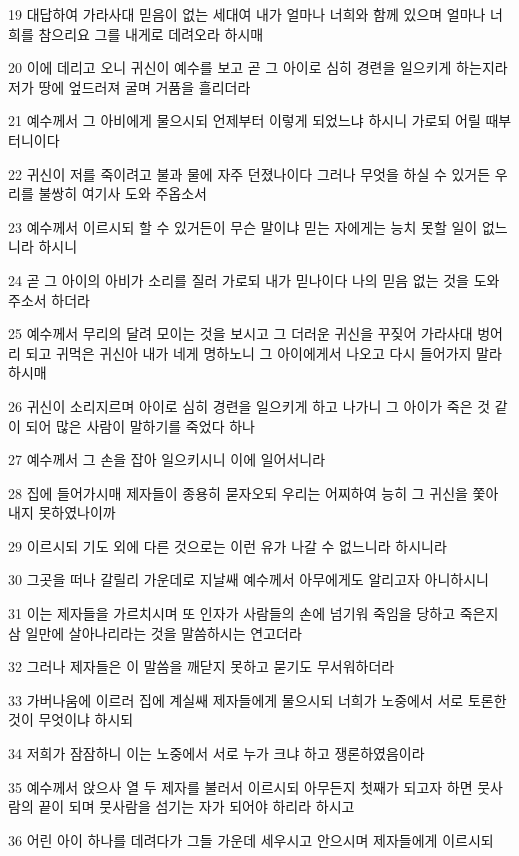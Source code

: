 \par 19 대답하여 가라사대 믿음이 없는 세대여 내가 얼마나 너희와 함께 있으며 얼마나 너희를 참으리요 그를 내게로 데려오라 하시매
\par 20 이에 데리고 오니 귀신이 예수를 보고 곧 그 아이로 심히 경련을 일으키게 하는지라 저가 땅에 엎드러져 굴며 거품을 흘리더라
\par 21 예수께서 그 아비에게 물으시되 언제부터 이렇게 되었느냐 하시니 가로되 어릴 때부터니이다
\par 22 귀신이 저를 죽이려고 불과 물에 자주 던졌나이다 그러나 무엇을 하실 수 있거든 우리를 불쌍히 여기사 도와 주옵소서
\par 23 예수께서 이르시되 할 수 있거든이 무슨 말이냐 믿는 자에게는 능치 못할 일이 없느니라 하시니
\par 24 곧 그 아이의 아비가 소리를 질러 가로되 내가 믿나이다 나의 믿음 없는 것을 도와 주소서 하더라
\par 25 예수께서 무리의 달려 모이는 것을 보시고 그 더러운 귀신을 꾸짖어 가라사대 벙어리 되고 귀먹은 귀신아 내가 네게 명하노니 그 아이에게서 나오고 다시 들어가지 말라 하시매
\par 26 귀신이 소리지르며 아이로 심히 경련을 일으키게 하고 나가니 그 아이가 죽은 것 같이 되어 많은 사람이 말하기를 죽었다 하나
\par 27 예수께서 그 손을 잡아 일으키시니 이에 일어서니라
\par 28 집에 들어가시매 제자들이 종용히 묻자오되 우리는 어찌하여 능히 그 귀신을 쫓아 내지 못하였나이까
\par 29 이르시되 기도 외에 다른 것으로는 이런 유가 나갈 수 없느니라 하시니라
\par 30 그곳을 떠나 갈릴리 가운데로 지날쌔 예수께서 아무에게도 알리고자 아니하시니
\par 31 이는 제자들을 가르치시며 또 인자가 사람들의 손에 넘기워 죽임을 당하고 죽은지 삼 일만에 살아나리라는 것을 말씀하시는 연고더라
\par 32 그러나 제자들은 이 말씀을 깨닫지 못하고 묻기도 무서워하더라
\par 33 가버나움에 이르러 집에 계실쌔 제자들에게 물으시되 너희가 노중에서 서로 토론한 것이 무엇이냐 하시되
\par 34 저희가 잠잠하니 이는 노중에서 서로 누가 크냐 하고 쟁론하였음이라
\par 35 예수께서 앉으사 열 두 제자를 불러서 이르시되 아무든지 첫째가 되고자 하면 뭇사람의 끝이 되며 뭇사람을 섬기는 자가 되어야 하리라 하시고
\par 36 어린 아이 하나를 데려다가 그들 가운데 세우시고 안으시며 제자들에게 이르시되
